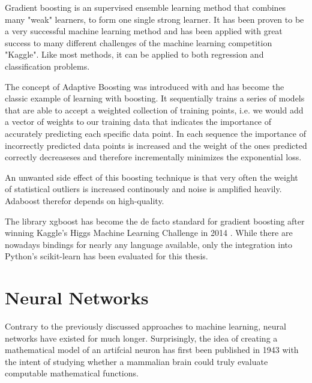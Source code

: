 Gradient boosting is an supervised ensemble learning method that combines many "weak" learners, to form one single strong learner.  It has been proven to be a very successful machine learning method and has been applied with great success to many different challenges of the machine learning competition "Kaggle". Like most methods, it can be applied to both regression and classification problems.

The concept of Adaptive Boosting was introduced with \cite{Freund97adecision-theoretic} and has become the classic example of learning with boosting. It sequentially trains a series of models that are able to accept a weighted collection of training points, i.e. we would add a vector of weights to our training data that indicates the importance of accurately predicting each specific data point. In each sequence the importance of incorrectly predicted data points is increased and the weight of the ones predicted correctly decreaseses and therefore incrementally minimizes the exponential loss.

An unwanted side effect of this boosting technique is that very often the weight of statistical outliers is increased continously and noise is amplified heavily. Adaboost therefor depends on high-quality. %

The library xgboost \cite{DBLP:journals/corr/ChenG16} has become the de facto standard for gradient boosting after winning Kaggle's Higgs Machine Learning Challenge in 2014 \cite{xgboost-wins}. While there are nowadays bindings for nearly any language available, only the integration into Python's scikit-learn has been evaluated for this thesis.

\newpage

\section{Neural Networks}
\label{nn}


Contrary to the previously discussed approaches to machine learning, neural networks have existed for much longer. Surprisingly, the idea of creating a mathematical model of an artifcial neuron has first been published in 1943 \cite{McCulloch1943} with the intent of studying whether a mammalian brain could truly evaluate computable mathematical functions.



